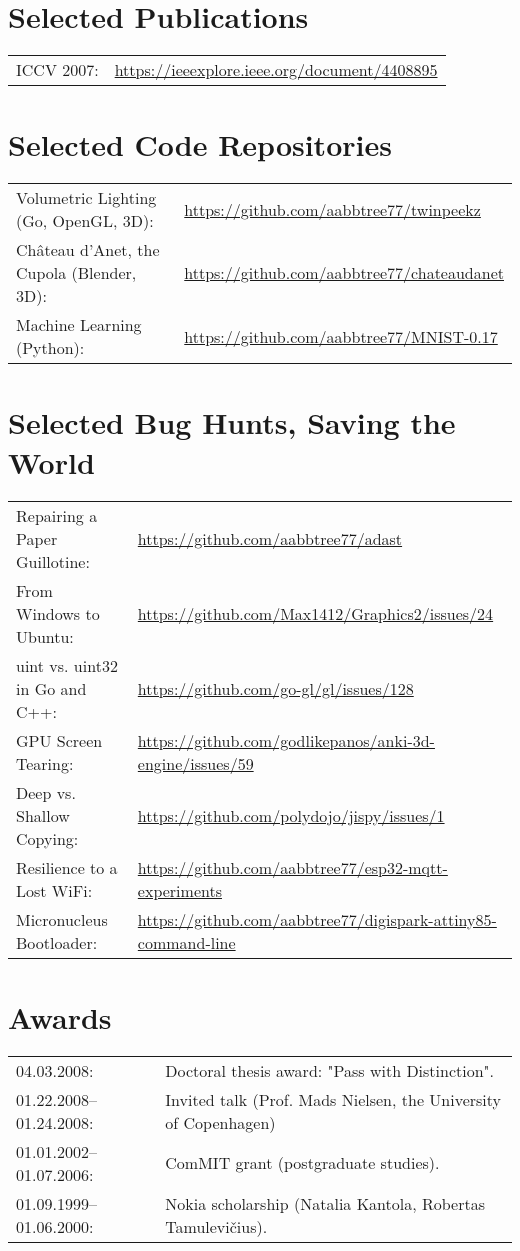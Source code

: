 \documentclass[a4paper,11pt]{article}
\begin{document}
\section*{Selected Publications}
\label{sect:pubs}

\begin{tabular}{ll}
ICCV 2007:& \url{https://ieeexplore.ieee.org/document/4408895}
\end{tabular}


%
\section*{Selected Code Repositories}
\begin{tabular}{ll}
Volumetric Lighting (Go, OpenGL, 3D): & \url{https://github.com/aabbtree77/twinpeekz}\\
Château d'Anet, the Cupola (Blender, 3D): & \url{https://github.com/aabbtree77/chateaudanet}\\
Machine Learning (Python): & \url{https://github.com/aabbtree77/MNIST-0.17}
\end{tabular}

%
\section*{Selected Bug Hunts, Saving the World}
\begin{tabular}{ll}
Repairing a Paper Guillotine: & \url{https://github.com/aabbtree77/adast}\\
From Windows to Ubuntu: & \url{https://github.com/Max1412/Graphics2/issues/24}\\
uint vs. uint32 in Go and C++: & \url{https://github.com/go-gl/gl/issues/128}\\
GPU Screen Tearing: & \url{https://github.com/godlikepanos/anki-3d-engine/issues/59}\\
Deep vs. Shallow Copying: & \url{https://github.com/polydojo/jispy/issues/1}\\
Resilience to a Lost WiFi: & \url{https://github.com/aabbtree77/esp32-mqtt-experiments}\\
Micronucleus Bootloader: & \url{https://github.com/aabbtree77/digispark-attiny85-command-line}\\
\end{tabular}

%
%
\section*{Awards}
%
\begin{tabular}{ll}
        04.03.2008: & Doctoral thesis award: "Pass with Distinction".\\
        01.22.2008--01.24.2008: & Invited talk (Prof. Mads Nielsen, the University of Copenhagen)\\
        01.01.2002--01.07.2006:& ComMIT grant (postgraduate studies).\\
        01.09.1999--01.06.2000:& Nokia scholarship (Natalia Kantola, Robertas Tamulevi\v{c}ius).
\end{tabular}
%
%

\end{document}
